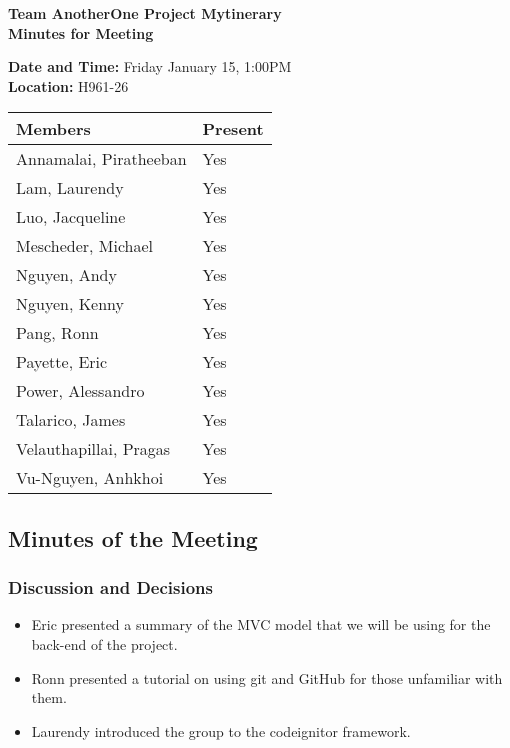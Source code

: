 \documentclass[paper=a4, fontsize=11pt]{scrartcl}
\begin{document}
\thispagestyle{empty}

\begin{center}
\textbf{Team AnotherOne \qquad Project Mytinerary \\ Minutes for Meeting}
\vspace{0.33cm}
\end{center}

\textbf{Date and Time: } Friday January 15, 1:00PM \\
\textbf{Location: } H961-26 \\

\begin{center}
\begin{tabular}{| m{4cm} | m{4cm} |} \hline
\textbf{Members} & \textbf{Present} \\ \hline
Annamalai, Piratheeban & Yes \\ \hline
Lam, Laurendy          & Yes \\ \hline
Luo, Jacqueline        & Yes \\ \hline
Mescheder, Michael     & Yes \\ \hline
Nguyen, Andy           & Yes \\ \hline
Nguyen, Kenny          & Yes \\ \hline
Pang, Ronn             & Yes \\ \hline
Payette, Eric          & Yes \\ \hline
Power, Alessandro      & Yes \\ \hline
Talarico, James        & Yes \\ \hline
Velauthapillai, Pragas & Yes \\ \hline
Vu-Nguyen, Anhkhoi     & Yes \\ \hline
\end{tabular}
\end{center}

\subsection*{Minutes of the Meeting}
\subsubsection*{Discussion and Decisions}
\begin{itemize}
    \item Eric presented a summary of the MVC model that we will be using for the back-end of the project.
    \item Ronn presented a tutorial on using git and GitHub for those unfamiliar with them.
    \item Laurendy introduced the group to the codeignitor framework.
\end{itemize}
\end{document}
